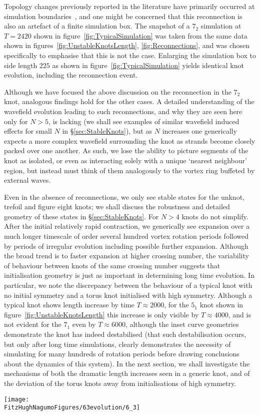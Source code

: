 Topology changes previously reported in the literature have primarily occurred at simulation boundaries~\citep{Maucher2017, Maucher2019}, and one might be concerned that this reconnection is also an artefact of a finite simulation box. The snapshot of a $7_2$ simulation at $T=2420$ shown in figure~\ref{fig:TypicalSimulation} was taken from the same data shown in figures~\ref{fig:UnstableKnotsLength}, \ref{fig:Reconnections}, and was chosen specifically to emphasise that this is not the case. Enlarging the simulation box to side length $225$ as shown in figure~\ref{fig:TypicalSimulation} yields identical knot evolution, including the reconnection event.

Although we have focused the above discussion on the reconnection in the $7_2$ knot, analogous findings hold for the other cases. A detailed understanding of the wavefield evolution leading to such reconnections, and why they are seen here only for $N>5$, is lacking (we shall see examples of similar wavefield induced effects for small $N$ in \S \ref{sec:StableKnots}), but as $N$ increases one generically expects a more complex wavefield surrounding the knot as strands become closely packed over one another. As such, we lose the ability to picture segments of the knot as isolated, or even as interacting solely with a unique `nearest neighbour' region, but instead must think of them analogously to the vortex ring buffeted by external waves.

Even in the absence of reconnections, we only see stable states for the unknot, trefoil and figure eight knots; we shall discuss the robustness and detailed geometry of these states in \S \ref{sec:StableKnots}. For $N>4$ knots do not simplify. After the initial relatively rapid contraction, we generically see expansion over a much longer timescale of order several hundred vortex rotation periods followed by periods of irregular evolution including possible further expansion. Although the broad trend is to faster expansion at higher crossing number, the variability of behaviour between knots of the same crossing number suggests that initialisation geometry is just as important in determining long time evolution. In particular, we note the discrepancy between the behaviour of a typical knot with no initial symmetry and a torus knot initialised with high symmetry. Although a typical knot shows length increase by time $T\approx2000$, for the $5_1$ knot shown in figure~\ref{fig:UnstableKnotsLength} this increase is only visible by $T\approx4000$, and is not evident for the $7_1$ even by $T\approx6000$, although the inset curve geometries demonstrate the knot has indeed destabilised (that such destabilisation occurs, but only after long time simulations, clearly demonstrates the necessity of simulating for many hundreds of rotation periods before drawing conclusions about the dynamics of this system). In the next section, we shall investigate the mechanisms of both the dramatic length increases seen in a generic knot, and of the deviation of the torus knots away from initialisations of high symmetry. 
\begin{figure*}[htbp]
\centering
    \texttt{[image: \\FitzHughNagumoFigures/63evolution/6\_3]}
\end{figure*}
